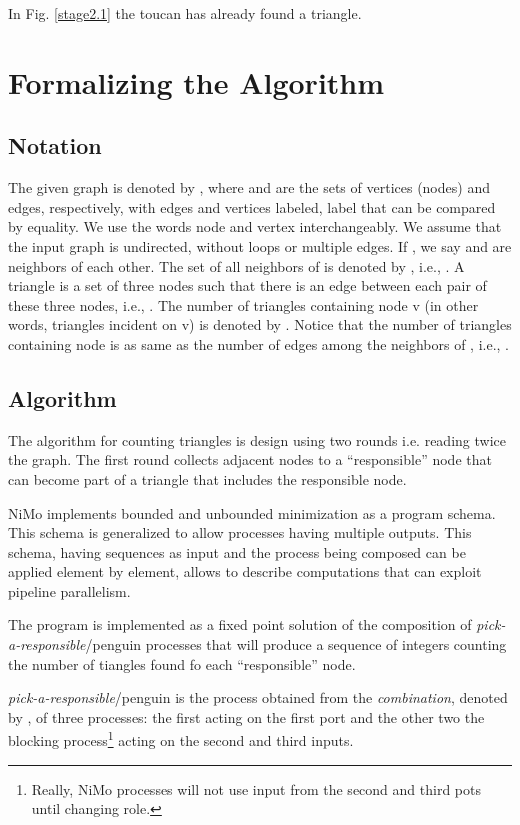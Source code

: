 \documentclass{article}                     \usepackage{graphics}
\begin{document}
In Fig. \ref{stage2.1} the toucan has already found a triangle.

	\section{Formalizing the Algorithm}		
\subsection{Notation}

The given graph  is denoted by , where  and 
are the sets of vertices (nodes) and edges, respectively, with
 edges and  vertices labeled, label that can be compared by equality. We use the words node and vertex interchangeably. We
assume that the input graph is undirected, without loops or multiple  edges. If ,
we say  and  are neighbors of each other. The set of
all neighbors of  is denoted by , i.e., .
A triangle is a set of three nodes  such that
there is an edge between each pair of these three nodes, i.e.,
. The number of triangles containing
node v (in other words, triangles incident on v) is denoted
by . Notice that the number of triangles containing node
 is as same as the number of edges among the neighbors of
, i.e., . 


\subsection{Algorithm}\label{formal}

The algorithm for counting triangles is design using two rounds i.e. reading twice the graph. The first round collects adjacent nodes to a ``responsible'' node that can become part of a triangle that includes the responsible node. 


NiMo implements bounded and unbounded minimization \cite{opac-b1083142} as a program schema. This schema is generalized to allow processes having  multiple outputs. 
This schema, having  sequences as input and the process being composed can be applied element by element, allows to describe computations that  can exploit pipeline parallelism.


The program is implemented as a fixed point solution of the composition of \textit{pick-a-responsible}/penguin processes that will produce a sequence of integers counting the number of tiangles found  fo each ``responsible'' node.

\textit{pick-a-responsible}/penguin  is the process obtained from the \textit{combination}, denoted by , of three processes: the first acting on the first port and the other two the blocking process\footnote{Really, NiMo processes will not use input from the second and third pots until changing  role.} acting on the second and third inputs.
\end{document}
